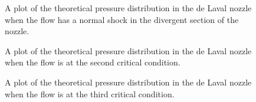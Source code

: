 \begin{figure}[htpb]
    \centering
    
    \caption{A plot of the theoretical pressure distribution in the de Laval nozzle when the flow has a normal shock in the divergent section of the nozzle.}
    \label{fig:theoretical_pressure_normal_shock}
\end{figure}


\begin{figure}[htpb]
    \centering
    
    \caption{A plot of the theoretical pressure distribution in the de Laval nozzle when the flow is at the second critical condition.}
    \label{fig:theoretical_pressure_2nd_critical}
\end{figure}

\begin{figure}[htpb]
    \centering
    
    \caption{A plot of the theoretical pressure distribution in the de Laval nozzle when the flow is at the third critical condition.}
    \label{fig:theoretical_pressure_3rd_critical}
    \vspace*{5.5in}
\end{figure}
